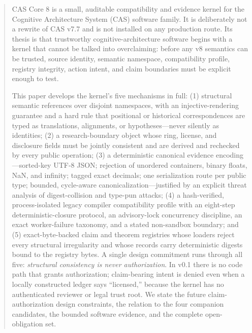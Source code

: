 \documentclass[11pt]{amsart}
\theoremstyle{definition}
\theoremstyle{remark}
\begin{document}
\begin{abstract}
CAS Core 8 is a small, auditable compatibility and evidence kernel for the Cognitive Architecture System (CAS) software family. It is deliberately not a rewrite of CAS v7.7 and is not installed on any production route. Its thesis is that trustworthy cognitive-architecture software begins with a kernel that cannot be talked into overclaiming: before any v8 semantics can be trusted, source identity, semantic namespace, compatibility profile, registry integrity, action intent, and claim boundaries must be explicit enough to test.

This paper develops the kernel's five mechanisms in full: (1) structural semantic references over disjoint namespaces, with an injective-rendering guarantee and a hard rule that positional or historical correspondences are typed as translations, alignments, or hypotheses---never silently as identities; (2) a research-boundary object whose ring, license, and disclosure fields must be jointly consistent and are derived and rechecked by every public operation; (3) a deterministic canonical evidence encoding---sorted-key UTF-8 JSON; rejection of unordered containers, binary floats, NaN, and infinity; tagged exact decimals; one serialization route per public type; bounded, cycle-aware canonicalization---justified by an explicit threat analysis of digest-collision and type-pun attacks; (4) a hash-verified, process-isolated legacy compiler compatibility profile with an eight-step deterministic-closure protocol, an advisory-lock concurrency discipline, an exact worker-failure taxonomy, and a stated non-sandbox boundary; and (5) exact-byte-backed claim and theorem registries whose loaders reject every structural irregularity and whose records carry deterministic digests bound to the registry bytes. A single design commitment runs through all five: \emph{structural consistency is never authorization}. In v0.1 there is no code path that grants authorization; claim-bearing intent is denied even when a locally constructed ledger says ``licensed,'' because the kernel has no authenticated reviewer or legal trust root. We state the future claim-authorization design constraints, the relation to the four companion candidates, the bounded software evidence, and the complete open-obligation set.
\end{abstract}

\maketitle
\tableofcontents
\end{document}
